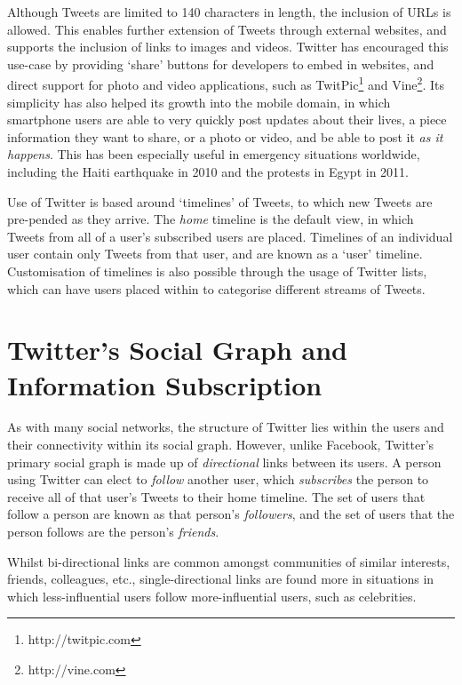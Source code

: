 Although Tweets are limited to 140 characters in length, the inclusion of URLs is allowed. This enables further extension of Tweets through external websites, and supports the inclusion of links to images and videos. Twitter has encouraged this use-case by providing `share' buttons for developers to embed in websites, and direct support for photo and video applications, such as TwitPic\footnote{http://twitpic.com} and Vine\footnote{http://vine.com}.
Its simplicity has also helped its growth into the mobile domain, in which smartphone users are able to very quickly post updates about their lives, a piece information they want to share, or a photo or video, and be able to post it \textit{as it happens}. This has been especially useful in emergency situations worldwide, including the Haiti earthquake in 2010 and the protests in Egypt in 2011.

Use of Twitter is based around `timelines' of Tweets, to which new Tweets are pre-pended as they arrive. The \textit{home} timeline is the default view, in which Tweets from all of a user's subscribed users are placed. Timelines of an individual user contain only Tweets from that user, and are known as a `user' timeline. Customisation of timelines is also possible through the usage of Twitter lists, which can have users placed within to categorise different streams of Tweets.


\section{Twitter's Social Graph and Information Subscription}
As with many social networks, the structure of Twitter lies within the users and their connectivity within its social graph. However, unlike Facebook, Twitter's primary social graph is made up of \textit{directional} links between its users. A person using Twitter can elect to \textit{follow} another user, which \textit{subscribes} the person to receive all of that user's Tweets to their home timeline. The set of users that follow a person are known as that person's \textit{followers}, and the set of users that the person follows are the person's \textit{friends}.

Whilst bi-directional links are common amongst communities of similar interests, friends, colleagues, etc., single-directional links are found more in situations in which less-influential users follow more-influential users, such as celebrities.


